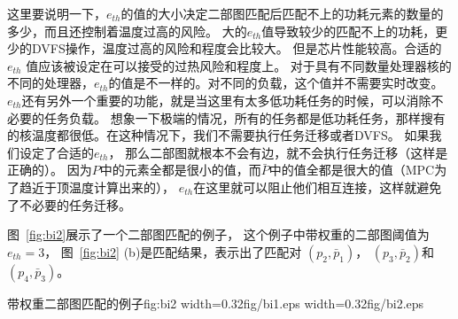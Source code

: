  这里要说明一下，$e_{th}$的值的大小决定二部图匹配后匹配不上的功耗元素的数量的多少，而且还控制着温度过高的风险。
 大的$e_{th}$值导致较少的匹配不上的功耗，更少的DVFS操作，温度过高的风险和程度会比较大。
 但是芯片性能较高。合适的$e_{th}$ 值应该被设定在可以接受的过热风险和程度上。 
 对于具有不同数量处理器核的不同的处理器，$e_{th}$的值是不一样的。对不同的负载，这个值并不需要实时改变。
 $e_{th}$还有另外一个重要的功能，就是当这里有太多低功耗任务的时候，可以消除不必要的任务负载。
 想象一下极端的情况，所有的任务都是低功耗任务，那样搜有的核温度都很低。在这种情况下，我们不需要执行任务迁移或者DVFS。
 如果我们设定了合适的$e_{th}$， 那么二部图就根本不会有边，就不会执行任务迁移（这样是正确的）。
 因为$P$中的元素全都是很小的值，而$\bar{P}$中的值全都是很大的值（MPC为了趋近于顶温度计算出来的），
 $e_{th}$在这里就可以阻止他们相互连接，这样就避免了不必要的任务迁移。
 
 图~\ref{fig:bi2}展示了一个二部图匹配的例子， 这个例子中带权重的二部图阈值为$e_{th}=3$，
  图~\ref{fig:bi2} (b)是匹配结果，表示出了匹配对 $(p_2, \bar{p}_1)$， $(p_3, \bar{p}_2)$和 $(p_4, \bar{p}_3)$。
 \begin{pics}[H]{带权重二部图匹配的例子}{fig:bi2}
   {width=0.32\columnwidth}{fig/bi1.eps}
   {width=0.32\columnwidth}{fig/bi2.eps}
 \end{pics}
 






























